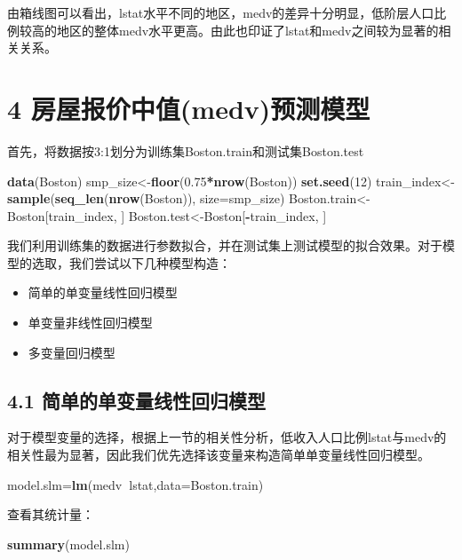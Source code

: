\documentclass[UTF-8]{ctexart}
\newenvironment{Shaded}{\begin{snugshade}}{\end{snugshade}}
\newcommand{\DataTypeTok}[1]{\textcolor[rgb]{0.13,0.29,0.53}{#1}}
\newcommand{\DecValTok}[1]{\textcolor[rgb]{0.00,0.00,0.81}{#1}}
\newcommand{\FloatTok}[1]{\textcolor[rgb]{0.00,0.00,0.81}{#1}}
\newcommand{\KeywordTok}[1]{\textcolor[rgb]{0.13,0.29,0.53}{\textbf{#1}}}
\newcommand{\NormalTok}[1]{#1}
\newcommand{\OperatorTok}[1]{\textcolor[rgb]{0.81,0.36,0.00}{\textbf{#1}}}
\begin{document}
由箱线图可以看出，lstat水平不同的地区，medv的差异十分明显，低阶层人口比例较高的地区的整体medv水平更高。由此也印证了lstat和medv之间较为显著的相关关系。

\section{4 房屋报价中值(medv)预测模型}

首先，将数据按3:1划分为训练集Boston.train和测试集Boston.test
\begin{Shaded}
	\begin{Highlighting}[]
\KeywordTok{data}\NormalTok{(Boston)}
\NormalTok{smp_size<-}\KeywordTok{floor}\NormalTok{(}\FloatTok{0.75}\OperatorTok{*}\KeywordTok{nrow}\NormalTok{(Boston))}
\KeywordTok{set.seed}\NormalTok{(}\DecValTok{12}\NormalTok{)}
\NormalTok{train_index<-}\KeywordTok{sample}\NormalTok{(}\KeywordTok{seq_len}\NormalTok{(}\KeywordTok{nrow}\NormalTok{(Boston)), }\DataTypeTok{size=}\NormalTok{smp_size)}
\NormalTok{Boston.train<-Boston[train_index, ]}
\NormalTok{Boston.test<-Boston[}\OperatorTok{-}\NormalTok{train_index, ]}
	\end{Highlighting}
\end{Shaded}

我们利用训练集的数据进行参数拟合，并在测试集上测试模型的拟合效果。对于模型的选取，我们尝试以下几种模型构造：
\begin{itemize}
	\item 简单的单变量线性回归模型
	\item 单变量非线性回归模型
	\item 多变量回归模型
\end{itemize}

\subsection{4.1 简单的单变量线性回归模型}
对于模型变量的选择，根据上一节的相关性分析，低收入人口比例lstat与medv的相关性最为显著，因此我们优先选择该变量来构造简单单变量线性回归模型。
\begin{Shaded}
	\begin{Highlighting}[]
\NormalTok{model.slm=}\KeywordTok{lm}\NormalTok{(medv}\OperatorTok{~}\NormalTok{lstat,}\DataTypeTok{data=}\NormalTok{Boston.train)}
	\end{Highlighting}
\end{Shaded}

查看其统计量：

\begin{Shaded}
	\begin{Highlighting}[]
\KeywordTok{summary}\NormalTok{(model.slm)}
	\end{Highlighting}
\end{Shaded}
\end{document}
